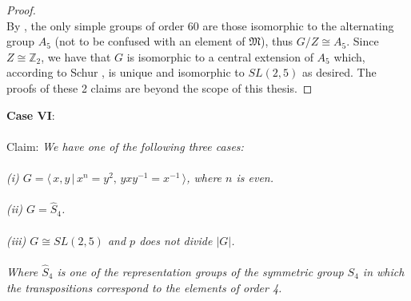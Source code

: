 \documentclass[a4paper , 11pt]{book}
\theoremstyle{definition}
\theoremstyle{remark}
\begin{document}
\begin{proof}
\\
By \cite[p.145]{dummit}, the only simple groups of order 60 are those isomorphic to the alternating group $A_5$ (not to be confused with an element of $\mathfrak{M}$), thus $G / Z \cong A_5$. Since $Z \cong \mathbb{Z}_2$, we have that $G$ is isomorphic to a central extension of $A_5$ which, according to Schur \cite{schur}, is unique and isomorphic to $SL(2,5)$ as desired. The proofs of these 2 claims are beyond the scope of this thesis. \qedhere

\end{proof}

\textbf{Case VI}:\\
\\
Claim: \textit{We have one of the following three cases: \\
\\
(i) $G = \langle \, x,y \, | \, x^n = y^2, \, yxy^{-1} = x^{-1} \, \rangle$, where $n$ is even. \\
\\
(ii) $G = \widehat{S}_4$. \\
\\
(iii) $G \cong SL(2,5)$ and $p$ does not divide $|G|$. \\
\\
Where $\widehat{S}_4$ is one of the representation groups of the symmetric group $S_4$ in which the transpositions correspond to the elements of order 4.} \\
\end{document}
